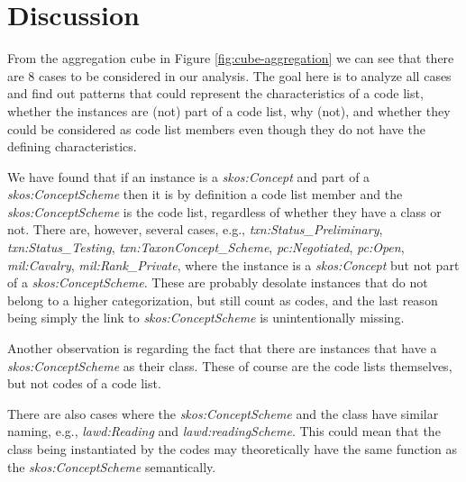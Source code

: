 
\section{Discussion}
\label{s:discussion}
From the aggregation cube in Figure \ref{fig:cube-aggregation} we can see that there are 8 cases to be considered in our analysis. The goal here is to analyze all cases and find out patterns that could represent the characteristics of a code list, whether the instances are (not) part of a code list, why (not), and whether they could be considered as code list members even though they do not have the defining characteristics.

We have found that if an instance is a \textit{skos:Concept} and part of a \textit{skos:ConceptScheme} then it is by definition a code list member and the \textit{skos:ConceptScheme} is the code list, regardless of whether they have a class or not. There are, however, several cases, e.g., \textit{txn:Status\_Preliminary}, \textit{txn:Status\_Testing}, \textit{txn:TaxonConcept\_Scheme}, \textit{pc:Negotiated}, \textit{pc:Open},  \textit{mil:Cavalry},  \textit{mil:Rank\_Private}, where the instance is a \textit{skos:Concept} but not part of a \textit{skos:ConceptScheme}. These are probably desolate instances that do not belong to a higher categorization, but still count as codes, and the last reason being simply the link to \textit{skos:ConceptScheme} is unintentionally missing.

Another observation is regarding the fact that there are instances that have a \textit{skos:ConceptScheme} as their class. These of course are the code lists themselves, but not codes of a code list. 

There are also cases where the \textit{skos:ConceptScheme} and the class have similar naming, e.g., \textit{lawd:Reading} and \textit{lawd:readingScheme}. This could mean that the class being instantiated by the codes may theoretically have the same function as the \textit{skos:ConceptScheme} semantically.

